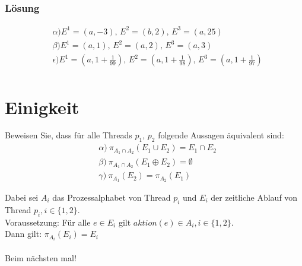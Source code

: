 \documentclass[a4paper]{scrartcl}
\begin{document}
\subsubsection*{Lösung}
\begin{align*}
& \alpha ) E^1 = (a, -3) \text{, } E^2 = (b, 2) \text{, } E^3 = (a, 25) \\
& \beta ) E^1 = (a, 1) \text{, } E^2 = (a, 2) \text{, } E^3 = (a, 3) \\
& \epsilon ) E^1 = (a, 1 + \frac{1}{99}) \text{, } E^2 = (a, 1 + \frac{1}{98}) \text{, } E^3 = (a, 1 + \frac{1}{97}) \\
\end{align*}


\section{Einigkeit}

Beweisen Sie, dass für alle Threads $ p_1 $, $ p_2 $ folgende Aussagen äquivalent sind:
\begin{align*}
& \alpha) \ \pi_{A_1 \cap A_2} \left(E_1 \cup E_2\right) = E_1 \cap E_2\\
& \beta) \ \pi_{A_1 \cap A_2} \left(E_1 \oplus E_2\right) = \emptyset\\
& \gamma) \ \pi_{A_1} \left(E_2\right) = \pi_{A_2} \left(E_1\right)
\end{align*}

Dabei sei $ A_i $ das Prozessalphabet von Thread $ p_i $ und $ E_i $ der zeitliche Ablauf von Thread $ p_i, i \in \{1, 2\}$.\\
Voraussetzung: Für alle $ e \in E_i $ gilt $ aktion(e) \in A_i, i \in \{1, 2\} $.\\
Dann gilt: $ \pi_{A_i} \left(E_i\right) = E_i $\\
\\
Beim nächsten mal!
\end{document}
